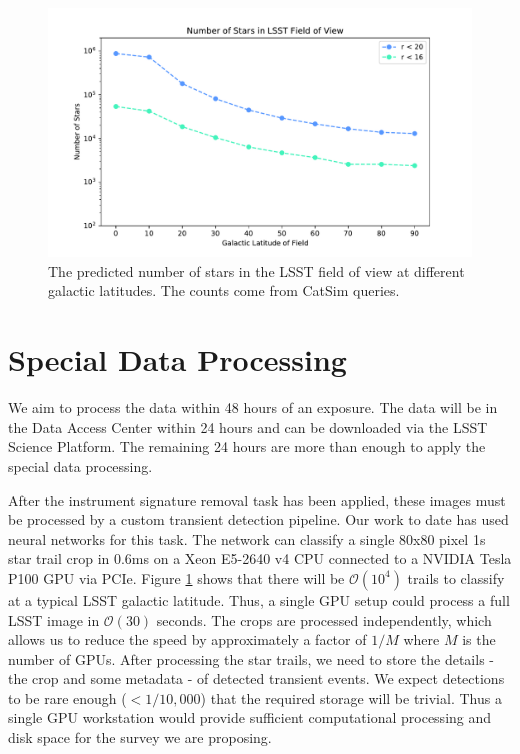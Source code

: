 \documentclass[12pt, letterpaper]{article}
\begin{document}
\begin{figure}
\center
\includegraphics[width=0.95\columnwidth]{starcount.pdf}
\caption{The predicted number of stars in the LSST field of view at different galactic latitudes. The counts come from CatSim queries.}
\label{fig:count}
\end{figure}

\vspace{.6in}

\section{Special Data Processing}

We aim to process the data within 48 hours of an exposure. The data will be in the Data Access Center within 24 hours and can be downloaded via the LSST Science Platform. The remaining 24 hours are more than enough to apply the special data processing.

After the instrument signature removal task has been applied, these images must be processed by a custom transient detection pipeline. Our work to date has used neural networks for this task. The network can classify a single 80x80 pixel 1s star trail crop in 0.6ms on a Xeon E5-2640 v4 CPU connected to a NVIDIA Tesla P100 GPU via PCIe. Figure \ref{fig:count} shows that there will be $\mathcal{O}(10^4)$ trails to classify at a typical LSST galactic latitude. Thus, a single GPU setup could process a full LSST image in $\mathcal{O}(30)$ seconds. The crops are processed independently, which allows us to reduce the speed by approximately a factor of $1/M$ where $M$ is the number of GPUs.  After processing the star trails, we need to store the details - the crop and some metadata - of detected transient events. We expect detections to be rare enough ($< 1/10,000$) that the required storage will be trivial. Thus a single GPU workstation would provide sufficient computational processing and disk space for the survey we are proposing.
\end{document}
